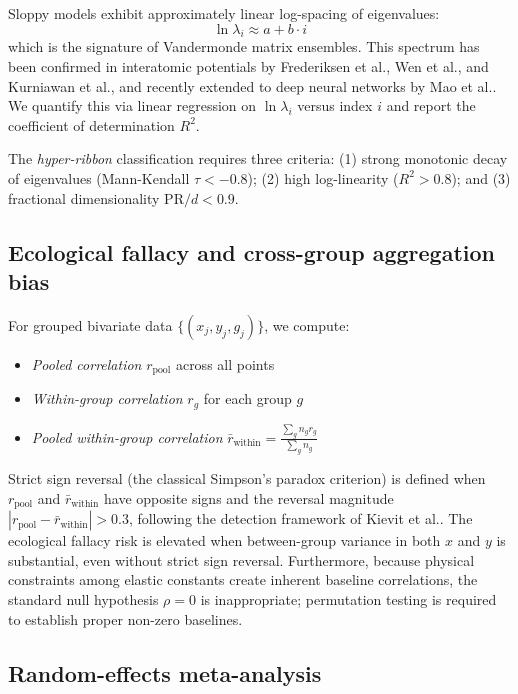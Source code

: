 \documentclass[twocolumn,9pt]{extarticle}
\begin{document}
Sloppy models exhibit approximately linear log-spacing of eigenvalues:
\begin{equation}
\ln \lambda_i \approx a + b \cdot i
\end{equation}
which is the signature of Vandermonde matrix ensembles\cite{waterfall2006}. This spectrum has been confirmed in interatomic potentials by Frederiksen et al.\cite{frederiksen2004}, Wen et al.\cite{wen2017}, and Kurniawan et al.\cite{kurniawan2022}, and recently extended to deep neural networks by Mao et al.\cite{mao2024,mao2026}. We quantify this via linear regression on $\ln \lambda_i$ versus index $i$ and report the coefficient of determination $R^2$.

The \textit{hyper-ribbon} classification requires three criteria: (1) strong monotonic decay of eigenvalues (Mann-Kendall $\tau < -0.8$); (2) high log-linearity ($R^2 > 0.8$); and (3) fractional dimensionality $\text{PR}/d < 0.9$.

\subsection{Ecological fallacy and cross-group aggregation bias}

For grouped bivariate data $\{(x_j, y_j, g_j)\}$, we compute:
\begin{itemize}
\item \textit{Pooled correlation} $r_\text{pool}$ across all points
\item \textit{Within-group correlation} $r_g$ for each group $g$
\item \textit{Pooled within-group correlation} $\bar{r}_\text{within} = \frac{\sum_g n_g r_g}{\sum_g n_g}$
\end{itemize}

Strict sign reversal (the classical Simpson's paradox criterion) is defined when $r_\text{pool}$ and $\bar{r}_\text{within}$ have opposite signs and the reversal magnitude $|r_\text{pool} - \bar{r}_\text{within}| > 0.3$, following the detection framework of Kievit et al.\cite{kievit2013}. The ecological fallacy risk is elevated when between-group variance in both $x$ and $y$ is substantial, even without strict sign reversal. Furthermore, because physical constraints among elastic constants create inherent baseline correlations, the standard null hypothesis $\rho = 0$ is inappropriate\cite{jackson1991,archie1981}; permutation testing is required to establish proper non-zero baselines.

\subsection{Random-effects meta-analysis}
\end{document}
